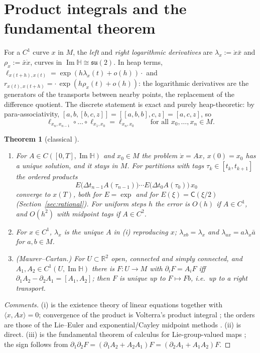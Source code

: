 \documentclass[11pt,reqno]{amsart}
\newtheorem{theorem}{Theorem}[section]
\theoremstyle{definition}
\theoremstyle{remark}
\numberwithin{equation}{section}
\newcommand{\R}{\mathbb{R}}
\newcommand{\HH}{\mathbb{H}}
\newcommand{\su}{\mathfrak{su}}
\newcommand{\im}{\operatorname{Im}}
\newcommand{\ip}[2]{\langle #1,#2\rangle}
\newcommand{\hp}[3]{[#1,#2,#3]}
\newcommand{\Cay}{\mathsf{C}}
\begin{document}
\section{Product integrals and the fundamental theorem}

For a $C^1$ curve $x$ in $M$, the \emph{left} and \emph{right logarithmic derivatives} are
$\lambda_x:=\dot x\bar x$ and $\rho_x:=\bar x\dot x$, curves in $\im\HH\cong\su(2)$.  In heap terms,
$\ell_{x(t+h),x(t)}=\exp(h\lambda_x(t)+o(h))\cdot$ and $r_{x(t),x(t+h)}=\cdot\,\exp(h\rho_x(t)+o(h))$: the
logarithmic derivatives are the generators of the transports between nearby points, the replacement of the
difference quotient.  The discrete statement is exact and purely heap-theoretic: by para-associativity,
$\hp ab{\hp bcz}=\hp{\hp abb}cz=\hp acz$, so
\begin{equation}\label{eq:telescope}
\ell_{x_n,x_{n-1}}\circ\dots\circ\ell_{x_1,x_0}=\ell_{x_n,x_0}\qquad\text{for all }x_0,\dots,x_n\in M .
\end{equation}

\begin{theorem}[classical \cite{Volterra,DF,Slavik,CG,IMNZ,Iserles01,DLP,Sharpe}]\label{thm:ftc}
\begin{enumerate}[label=(\roman*)]
\item For $A\in C([0,T],\im\HH)$ and $x_0\in M$ the problem $\dot x=Ax$, $x(0)=x_0$ has a unique solution, and
it stays in $M$.  For partitions with tags $\tau_k\in[t_k,t_{k+1}]$ the ordered products
\[
E\bigl(\Delta t_{n-1}A(\tau_{n-1})\bigr)\cdots E\bigl(\Delta t_0A(\tau_0)\bigr)\,x_0
\]
converge to $x(T)$, both for $E=\exp$ and for $E(\xi)=\Cay(\xi/2)$ (Section~\ref{sec:rational}).  For uniform steps $h$ the error is $O(h)$ if $A\in C^1$,
and $O(h^2)$ with midpoint tags if $A\in C^2$.
\item For $x\in C^1$, $\lambda_x$ is the unique $A$ in (i) reproducing $x$; $\lambda_{xb}=\lambda_x$ and
$\lambda_{ax}=a\lambda_x\bar a$ for $a,b\in M$.
\item \emph{(Maurer--Cartan.)} For $U\subset\R^2$ open, connected and simply connected, and $A_1,A_2\in C^1(U,\im\HH)$ there is
$F\colon U\to M$ with $\partial_iF=A_iF$ iff $\partial_1A_2-\partial_2A_1=[A_1,A_2]$; then $F$ is unique up
to $F\mapsto Fb$, i.e.\ up to a right transport.
\end{enumerate}
\end{theorem}
\begin{proof}[Comments]
(i) is the existence theory of linear equations together with $\ip x{Ax}=0$; convergence of the product is
Volterra's product integral \cite{Volterra,DF,Slavik}; the orders are those of the Lie--Euler and
exponential/Cayley midpoint methods \cite{CG,IMNZ,Iserles01,DLP}.  (ii) is direct.  (iii) is the
fundamental theorem of calculus for Lie-group-valued maps \cite[Ch.~3]{Sharpe}; the sign follows
from $\partial_1\partial_2F=(\partial_1A_2+A_2A_1)F=(\partial_2A_1+A_1A_2)F$.
\end{proof}
\end{document}
